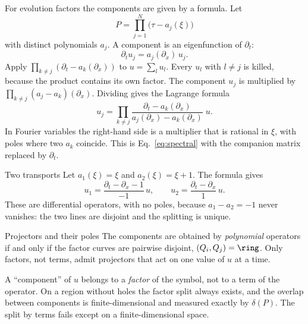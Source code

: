 For evolution factors the components are given by a formula. Let
\[
P=\prod_{j=1}^N\big(\tau-a_j(\xi)\big)
\]
with distinct polynomials $a_j$. A component is an eigenfunction of $\partial_t$:
\[
\partial_tu_j=a_j(\partial_x)\,u_j .
\]
Apply $\prod_{k\ne j}(\partial_t-a_k(\partial_x))$ to $u=\sum_lu_l$. Every $u_l$ with $l\ne j$ is killed, because the product contains its own factor. The component $u_j$ is multiplied by $\prod_{k\ne j}(a_j-a_k)(\partial_x)$. Dividing gives the Lagrange formula
\begin{equation}\label{eq:lagrange}
u_j=\prod_{k\ne j}\frac{\partial_t-a_k(\partial_x)}{a_j(\partial_x)-a_k(\partial_x)}\;u .
\end{equation}
In Fourier variables the right-hand side is a multiplier that is rational in $\xi$, with poles where two $a_k$ coincide. This is Eq.~\eqref{eq:spectral} with the companion matrix replaced by $\partial_t$.

\begin{example}{Two transports}
Let $a_1(\xi)=\xi$ and $a_2(\xi)=\xi+1$. The formula gives
\[
u_1=\frac{\partial_t-\partial_x-1}{-1}\,u,\qquad u_2=\frac{\partial_t-\partial_x}{1}\,u .
\]
These are differential operators, with no poles, because $a_1-a_2=-1$ never vanishes: the two lines are disjoint and the splitting is unique.
\end{example}

\begin{proposition}{Projectors and their poles  \proved}\label{prop:poly-proj}
The components are obtained by \emph{polynomial} operators if and only if the factor curves are pairwise disjoint, $(Q_i,Q_j)=\ring$. Only factors, not terms, admit projectors that act on one value of $u$ at a time.

\end{proposition}

\begin{keypoint}
A ``component'' of $u$ belongs to a \emph{factor} of the symbol, not to a term of the operator. On a region without holes the factor split always exists, and the overlap between components is finite-dimensional and measured exactly by $\delta(P)$. The split by terms fails except on a finite-dimensional space.
\end{keypoint}
